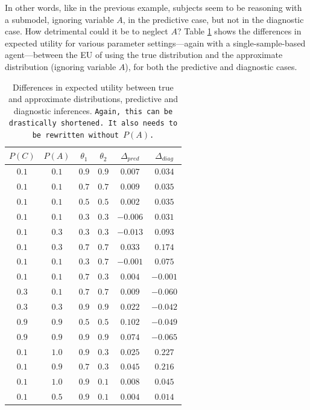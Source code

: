 \documentclass[10pt,letterpaper]{article}
\begin{document}
In other words, like in the previous example, subjects seem to be reasoning with a submodel, ignoring variable $A$, in the predictive case, but not in the diagnostic case. How detrimental could it be to neglect $A$? Table \ref{predictive} shows the differences in expected utility for various parameter settings---again with a single-sample-based agent---between the EU of using the true distribution and the approximate distribution (ignoring variable $A$), for both the predictive and diagnostic cases. 
\begin{table}[h]  \begin{center}
\begin{tabular}{c | c | c | c | c | c}
 $P(C)$ & $P(A)$ & $\theta_1$ & $\theta_2$ & $\Delta_{pred}$ & $\Delta_{diag}$ \\ \hline
 $0.1$ & $0.1$ &  $0.9$ & $0.9$ & $0.007$ & $0.034$ \\
 $0.1$ & $0.1$ &  $0.7$ & $0.7$ & $0.009$ & $0.035$ \\
 $0.1$ & $0.1$ &  $0.5$ & $0.5$ & $0.002$ & $0.035$ \\
 $0.1$ & $0.1$ &  $0.3$ & $0.3$ & $-0.006$ & $0.031$ \\
 $0.1$ & $0.3$ &  $0.3$ & $0.3$ & $-0.013$ & $0.093$ \\
 $0.1$ & $0.3$ &  $0.7$ & $0.7$ & $0.033$ & $0.174$ \\
 $0.1$ & $0.1$ &  $0.3$ & $0.7$ & $-0.001$ & $0.075$ \\
 $0.1$ & $0.1$ &  $0.7$ & $0.3$ & $0.004$ & $-0.001$ \\
 $0.3$ & $0.1$ &  $0.7$ & $0.7$ & $0.009$ & $-0.060$ \\
 $0.3$ & $0.3$ &  $0.9$ & $0.9$ & $0.022$ & $-0.042$ \\
 $0.9$ & $0.9$ &  $0.5$ & $0.5$ & $0.102$ & $-0.049$ \\
 $0.9$ & $0.9$ &  $0.9$ & $0.9$ & $0.074$ & $-0.065$ \\
 $0.1$ & $1.0$ & $0.9$ & $0.3$ & $0.025$ & $0.227$ \\
 $0.1$ & $0.9$ &  $0.7$ & $0.3$ & $0.045$ & $0.216$ \\
 $0.1$ & $1.0$ & $0.9$ & $0.1$ & $0.008$ & $0.045$ \\
  $0.1$ & $0.5$ &  $0.9$ & $0.1$ & $0.004$ & $0.014$
\end{tabular} \end{center} \caption{Differences in expected utility between true and approximate distributions, predictive and diagnostic inferences. \texttt{Again, this can be drastically shortened. It also needs to be rewritten without $P(A)$.}} \label{predictive}
\end{table} 
\end{document}
